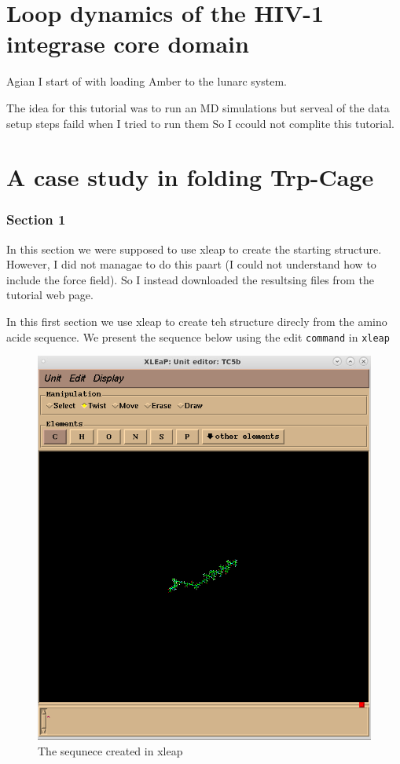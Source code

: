\documentclass[11pt]{article}
\makeatletter
\def\maxwidth{\ifdim\Gin@nat@width>\linewidth\linewidth
    \else\Gin@nat@width\fi}
\let\Oldincludegraphics\includegraphics
\renewcommand{\includegraphics}[1]{\Oldincludegraphics[width=.8\maxwidth]{#1}}
\makeatother
\begin{document}
    \section{Loop dynamics of the HIV-1 integrase core
domain}\label{loop-dynamics-of-the-hiv-1-integrase-core-domain}

Agian I start of with loading Amber to the lunarc system.

The idea for this tutorial was to run an MD simulations but serveal of
the data setup steps faild when I tried to run them So I ccould not
complite this tutorial.

    \section{A case study in folding
Trp-Cage}\label{a-case-study-in-folding-trp-cage}

\subsubsection{Section 1}\label{section-1}

In this section we were supposed to use xleap to create the starting
structure. However, I did not managae to do this paart (I could not
understand how to include the force field). So I instead downloaded the
resultsing files from the tutorial web page.

In this first section we use xleap to create teh structure direcly from
the amino acide sequence. We present the sequence below using the edit
\texttt{command} in \texttt{xleap}

\begin{figure}
\centering
\includegraphics{Screenshot_xleap.png}
\caption{The sequnece created in xleap}
\end{figure}
\end{document}
